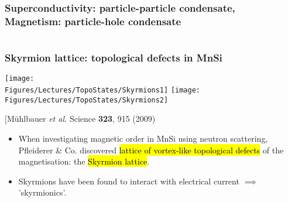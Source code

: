 \begin{frame}[label=Condensates]
  \frametitle{Superconductivity: particle-particle condensate, \\ \hfill  Magnetism: particle-hole condensate}

\begin{columns}[c]

\end{columns}

\vspace{2em}

\begin{columns}[c]

\end{columns}

\end{frame}


\begin{frame}[label=Skyrmions]
\frametitle{Skyrmion lattice: topological defects in MnSi}

\centerline{\texttt{[image: \\Figures/Lectures/TopoStates/Skyrmions1]}
\texttt{[image: \\Figures/Lectures/TopoStates/Skyrmions2]}}

\centerline{\small{[M\"uhlbauer {\em et al.} Science {\bf 323}, 915 (2009)}}

\begin{itemize}
\item
When investigating magnetic order in MnSi using neutron scattering, Pfleiderer \& Co. discovered \hl{lattice of vortex-like topological defects} of the magnetisation: the \hl{Skyrmion lattice}. 


\item
Skyrmions have been found to interact with electrical current $\implies$ 'skyrmionics'.

\end{itemize}
\end{frame}


